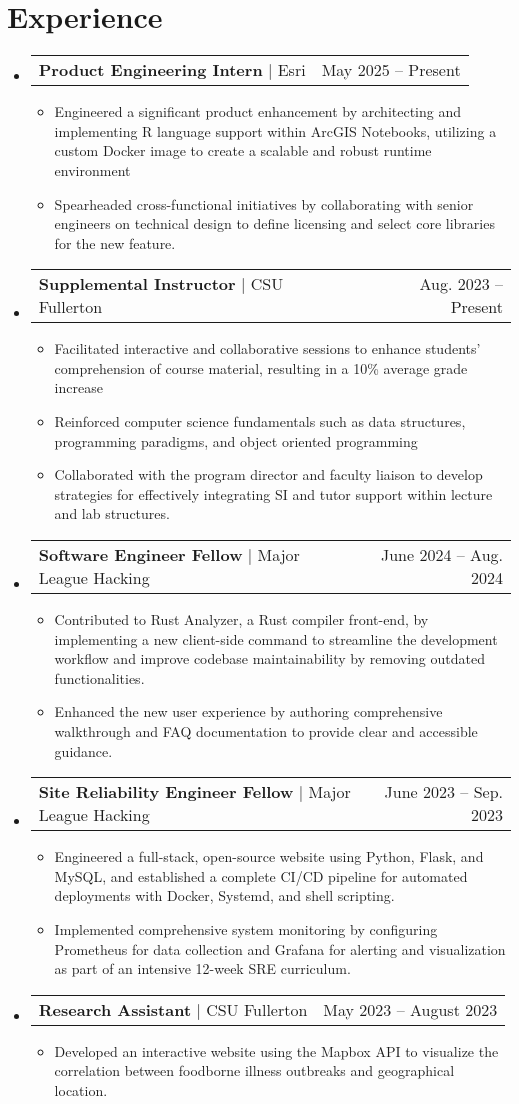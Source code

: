 \documentclass[letterpaper,11pt]{article}
\makeatletter
\newcommand{\resumeItem}[1]{
  \item\small{
    {#1 \vspace{-2pt}}
  }
}
\newcommand{\resumeProjectHeading}[2]{
    \item
    \begin{tabular*}{0.97\textwidth}{l@{\extracolsep{\fill}}r}
      \small#1 & #2 \\
    \end{tabular*}\vspace{-7pt}
}
\newcommand{\resumeSubHeadingListStart}{\begin{itemize}[leftmargin=0.15in, label={}]}
\newcommand{\resumeSubHeadingListEnd}{\end{itemize}}
\newcommand{\resumeItemListStart}{\begin{itemize}}
\newcommand{\resumeItemListEnd}{\end{itemize}\vspace{-5pt}}
\makeatother
\begin{document}
\section{Experience}
  \resumeSubHeadingListStart
    \resumeProjectHeading
            {\textbf{Product Engineering Intern} $|$ {Esri}}{May 2025 -- Present}
            \resumeItemListStart
              \resumeItem{Engineered a significant product enhancement by architecting and implementing R language support within ArcGIS Notebooks, utilizing a custom Docker image to create a scalable and robust runtime environment}
              \resumeItem{Spearheaded cross-functional initiatives by collaborating with senior engineers on technical design to define licensing and select core libraries for the new feature.}
    \resumeItemListEnd
    \resumeProjectHeading
            {\textbf{Supplemental Instructor} $|$ {CSU Fullerton}}{Aug. 2023 -- Present}
            \resumeItemListStart
              \resumeItem{Facilitated interactive and collaborative sessions to enhance students' comprehension of course material, resulting in a 10\% average grade increase}
              \resumeItem{Reinforced computer science fundamentals such as data structures, programming paradigms, and object oriented programming}
              \resumeItem{Collaborated with the program director and faculty liaison to develop strategies for effectively integrating SI and tutor support within lecture and lab structures.}
    \resumeItemListEnd
    \resumeProjectHeading
          {\textbf{Software Engineer Fellow} $|$ {Major League Hacking}}{June 2024 -- Aug. 2024}
          \resumeItemListStart
            \resumeItem{Contributed to Rust Analyzer, a Rust compiler front-end, by implementing a new client-side command to streamline the development workflow and improve codebase maintainability by removing outdated functionalities.}
            \resumeItem{Enhanced the new user experience by authoring comprehensive walkthrough and FAQ documentation to provide clear and accessible guidance.}
          \resumeItemListEnd
    \resumeProjectHeading
          {\textbf{Site Reliability Engineer Fellow} $|$ {Major League Hacking}}{June 2023 -- Sep. 2023}
          \resumeItemListStart
            \resumeItem{Engineered a full-stack, open-source website using Python, Flask, and MySQL, and established a complete CI/CD pipeline for automated deployments with Docker, Systemd, and shell scripting.}
            \resumeItem{Implemented comprehensive system monitoring by configuring Prometheus for data collection and Grafana for alerting and visualization as part of an intensive 12-week SRE curriculum.}
          \resumeItemListEnd
    \resumeProjectHeading
          {\textbf{Research Assistant} $|$ {CSU Fullerton}}{May 2023 -- August 2023}
          \resumeItemListStart
            \resumeItem{Developed an interactive website using the Mapbox API to visualize the correlation between foodborne illness outbreaks and geographical location.}
          \resumeItemListEnd
  \resumeSubHeadingListEnd
\end{document}
